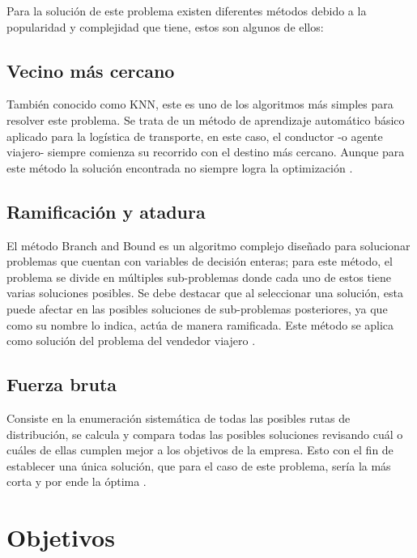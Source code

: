 \documentclass[journal]{IEEEtran}
\begin{document}
        Para la solución de este problema existen diferentes métodos debido a la popularidad y complejidad que tiene, estos son algunos de ellos:
        
        \subsection{Vecino más cercano}
        
            También conocido como KNN, este es uno de los algoritmos más simples para resolver este problema. Se trata de un método de aprendizaje automático básico aplicado para la logística de transporte, en este caso, el conductor -o agente viajero- siempre comienza su recorrido con el destino más cercano. Aunque para este método la solución encontrada no siempre logra la optimización \cite{trevelingProb}.

        \subsection{Ramificación y atadura}
        
            El método Branch and Bound es un algoritmo complejo diseñado para solucionar problemas que cuentan con variables de decisión enteras; para este método, el problema se divide en múltiples sub-problemas donde cada uno de estos tiene varias soluciones posibles. Se debe destacar que al seleccionar una solución, esta puede afectar en las posibles soluciones de sub-problemas posteriores, ya que como su nombre lo indica, actúa de manera ramificada. Este método se aplica como solución del problema del vendedor viajero \cite{trevelingProb}.

        \subsection{Fuerza bruta}
        
            Consiste en la enumeración sistemática de todas las posibles rutas de distribución, se calcula y compara todas las posibles soluciones revisando cuál o cuáles de ellas cumplen mejor a los objetivos de la empresa. Esto con el fin de establecer una única solución, que para el caso de este problema, sería la más corta y por ende la óptima \cite{trevelingProb}.
    
    \section{Objetivos} \label{sec:objectives}
\end{document}
